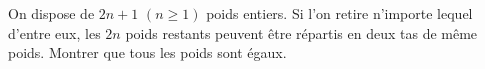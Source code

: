 On dispose de $2n + 1$ $(n \geq 1)$ poids entiers. Si l'on retire n'importe lequel d'entre eux, les $2n$ poids restants peuvent être répartis en deux tas de même poids. Montrer que tous les poids sont égaux.
